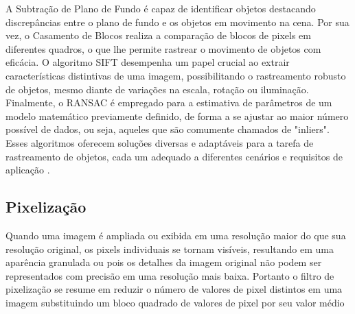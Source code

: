 A Subtração de Plano de Fundo é capaz de identificar objetos destacando discrepâncias entre o plano de fundo e os objetos em movimento na cena. Por sua vez, o Casamento de Blocos realiza a comparação de blocos de pixels em diferentes quadros, o que lhe permite rastrear o movimento de objetos com eficácia. O algoritmo \ac{SIFT} desempenha um papel crucial ao extrair características distintivas de uma imagem, possibilitando o rastreamento robusto de objetos, mesmo diante de variações na escala, rotação ou iluminação. Finalmente, o \ac{RANSAC} é empregado para a estimativa de parâmetros de um modelo matemático previamente definido, de forma a se ajustar ao maior número possível de dados, ou seja, aqueles que são comumente chamados de "inliers". Esses algoritmos oferecem soluções diversas e adaptáveis para a tarefa de rastreamento de objetos, cada um adequado a diferentes cenários e requisitos de aplicação \cite{tracking-algoritimo}.











\subsection[Pixelização]{Pixelização}

Quando uma imagem é ampliada ou exibida em uma resolução maior do que sua resolução original, os pixels individuais se tornam visíveis, resultando em uma aparência granulada ou  pois os detalhes da imagem original não podem ser representados com precisão em uma resolução mais baixa. Portanto o filtro de pixelização se resume em reduzir o número de valores de pixel distintos em uma imagem substituindo um bloco quadrado de valores de pixel por seu valor médio\cite{pixelizacao}




